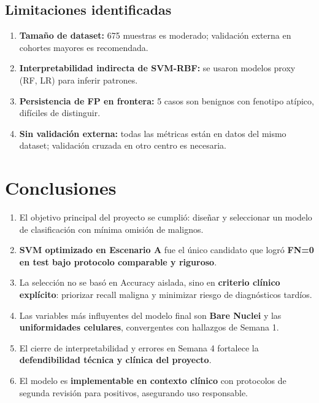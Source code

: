 \documentclass[11pt,a4paper]{article}
\begin{document}
\subsection{Limitaciones identificadas}

\begin{enumerate}[leftmargin=1.4cm]
\item \textbf{Tamaño de dataset:} 675 muestras es moderado; validación externa en cohortes mayores es recomendada.
\item \textbf{Interpretabilidad indirecta de SVM-RBF:} se usaron modelos proxy (RF, LR) para inferir patrones.
\item \textbf{Persistencia de FP en frontera:} 5 casos son benignos con fenotipo atípico, difíciles de distinguir.
\item \textbf{Sin validación externa:} todas las métricas están en datos del mismo dataset; validación cruzada en otro centro es necesaria.
\end{enumerate}

\section{Conclusiones}

\begin{enumerate}[leftmargin=1.4cm]
\item El objetivo principal del proyecto se cumplió: diseñar y seleccionar un modelo de clasificación con mínima omisión de malignos.

\item \textbf{SVM optimizado en Escenario A} fue el único candidato que logró \textbf{FN=0 en test bajo protocolo comparable y riguroso}.

\item La selección no se basó en Accuracy aislada, sino en \textbf{criterio clínico explícito}: priorizar recall maligna y minimizar riesgo de diagnósticos tardíos.

\item Las variables más influyentes del modelo final son \textbf{Bare Nuclei} y las \textbf{uniformidades celulares}, convergentes con hallazgos de Semana 1.

\item El cierre de interpretabilidad y errores en Semana 4 fortalece la \textbf{defendibilidad técnica y clínica del proyecto}.

\item El modelo es \textbf{implementable en contexto clínico} con protocolos de segunda revisión para positivos, asegurando uso responsable.
\end{enumerate}
\end{document}
